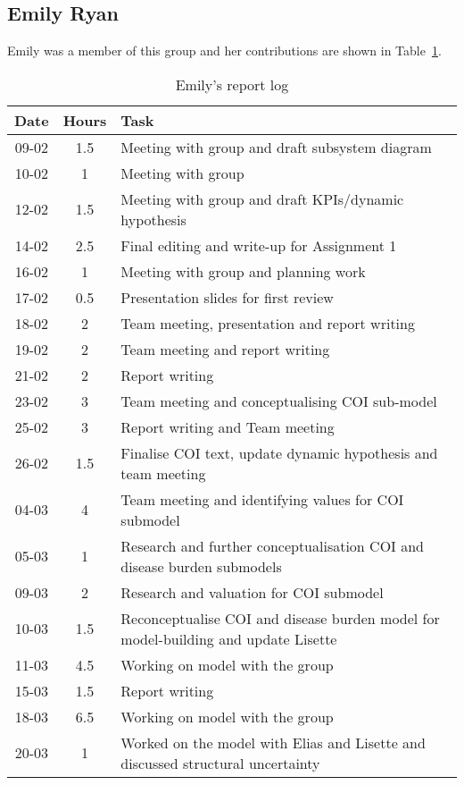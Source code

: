 
\subsection{Emily Ryan}
Emily was a member of this group and her contributions are shown in Table~\ref{tab:emily_log}. 
\begin{longtable}[c]{c|c|m{35em}}
\caption{Emily's report log}
\label{tab:emily_log}\\
\textbf{Date}& \textbf{Hours} & \textbf{Task} \\
\hline
\endfirsthead
%
\endhead
%
 09-02  &   1.5    & Meeting with group and draft subsystem diagram  \\
 10-02  &    1   & Meeting with group  \\
 12-02  &    1.5   & Meeting with group and draft KPIs/dynamic hypothesis  \\
 14-02  & 2.5  & Final editing and write-up for Assignment 1\\
 16-02 & 1 & Meeting with group and planning work\\
 17-02 & 0.5 & Presentation slides for first review\\
 18-02 & 2 & Team meeting, presentation and report writing\\
 19-02 & 2 & Team meeting and report writing\\
 21-02 & 2 & Report writing\\
 23-02 & 3 & Team meeting and conceptualising COI sub-model\\
 25-02 & 3 & Report writing and Team meeting\\
 26-02 & 1.5 & Finalise COI text, update dynamic hypothesis and team meeting\\
 04-03 & 4 & Team meeting and identifying values for COI submodel\\
 05-03 & 1 & Research and further conceptualisation COI and disease burden submodels\\
 09-03 & 2 & Research and valuation for COI submodel\\
 10-03 & 1.5 & Reconceptualise COI and disease burden model for model-building and update Lisette \\
 11-03 &  4.5 & Working on model with the group \\
 15-03 & 1.5 & Report writing \\
 18-03 & 6.5  & Working on model with the group \\
 20-03 & 1 & Worked on the model with Elias and Lisette and discussed structural uncertainty \\
 
\end{longtable}

